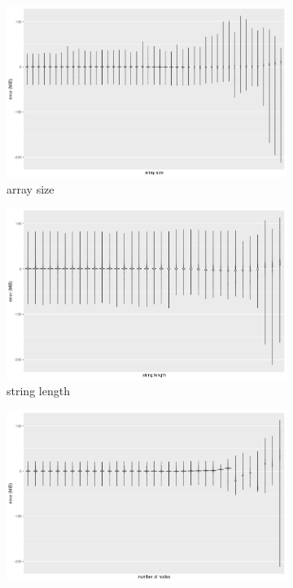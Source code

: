 \documentclass{article}
\begin{document}
\begin{figure}
  \centering
  \begin{subfigure}[t]{0.49\textwidth}
    \centering
    \includegraphics[width=\textwidth]{../local_experiments/io_memory_tests/plots/prediction_violin_array_size.png}
    \caption{array size}
  \end{subfigure}
  \begin{subfigure}[t]{0.49\textwidth}
    \centering
    \includegraphics[width=\textwidth]{../local_experiments/io_memory_tests/plots/prediction_violin_string_length.png}
    \caption{string length}
    \label{fig:prediction_violin_b}
  \end{subfigure}
  \begin{subfigure}[t]{0.49\textwidth}
    \centering
    \includegraphics[width=\textwidth]{../local_experiments/io_memory_tests/plots/prediction_violin_num_nodes.png}

\end{subfigure}
\end{figure}
\end{document}
